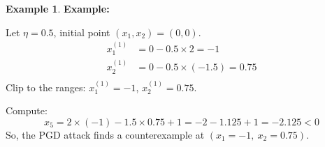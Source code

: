 \documentclass[oneside,11pt,dvipsnames]{book}
\numberwithin{equation}{section}
\theoremstyle{definition}
\newtheorem{example}{Example}[section]
\theoremstyle{remark}
\begin{document}
\begin{example}
\textbf{Example:}

Let $\eta = 0.5$, initial point $(x_1, x_2) = (0, 0)$.
\begin{align*}
x_1^{(1)} &= 0 - 0.5 \times 2 = -1 \\
x_2^{(1)} &= 0 - 0.5 \times (-1.5) = 0.75 \\
\end{align*}
Clip to the ranges: $x_1^{(1)} = -1$, $x_2^{(1)} = 0.75$.

Compute:
\[
x_5 = 2 \times (-1) - 1.5 \times 0.75 + 1 = -2 - 1.125 + 1 = -2.125 < 0
\]
So, the PGD attack finds a counterexample at $(x_1 = -1,\ x_2 = 0.75)$.

\end{example}







\end{document}
